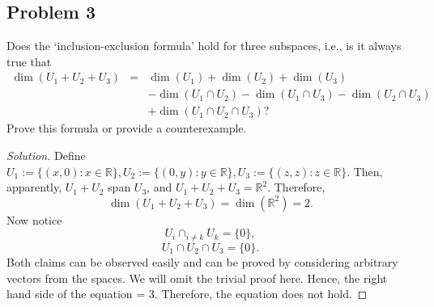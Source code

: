 \documentclass{article}
\begin{document}
\subsection*{Problem 3}
Does the `inclusion-exclusion formula' hold for three subspaces, i.e., is it always true that
\begin{eqnarray*} \dim (U_1+U_2+U_3) &= & \dim (U_1)+\dim (U_2)+ \dim (U_3) \\
&&  - \dim (U_1 \cap U_2)- \dim (U_1 \cap U_3)- \dim (U_2 \cap U_3)\\ && + \dim (U_1\cap U_2 \cap U_3)?
\end{eqnarray*} Prove this formula or provide a counterexample.
\begin{proof}[Solution]
    Define $U_1:=\{(x,0):x\in\mathbb{R}\}, U_2:=\{(0,y):y\in\mathbb{R}\}, 
    U_3:=\{(z,z):z\in\mathbb{R}\}$. Then, apparently, $U_1 + U_2$ span $U_3$, and $U_1+U_2+U_3=
    \mathbb{R}^2$. Therefore, $$\dim (U_1+U_2+U_3) = \dim (\mathbb{R}^2) = 2.$$ Now notice 
    $$U_i \cap_{i\neq k} U_k = \{0\},$$ $$U_1\cap U_2 \cap U_3 = \{0\}.$$
    Both claims can be observed easily and can be proved by considering arbitrary vectors 
    from the spaces. We will omit the trivial proof here.
    Hence, the right hand side of the equation = 3. Therefore, the equation does not hold.
\end{proof}

\newpage
\end{document}
